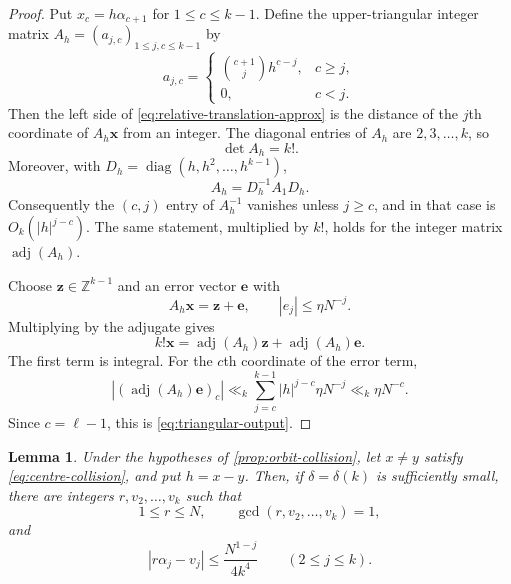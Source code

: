 \documentclass[11pt,reqno]{amsart}
\numberwithin{equation}{section}
\newtheorem{lemma}[lemma]{Lemma}
\theoremstyle{definition}
\theoremstyle{remark}
\newcommand{\Z}{\mathbb Z}
\begin{document}
\begin{proof}
Put $x_c=h\alpha_{c+1}$ for $1\le c\le k-1$.  Define the upper-triangular integer matrix $A_h=(a_{j,c})_{1\le j,c\le k-1}$ by
\[
  a_{j,c}=
  \begin{cases}
    \displaystyle\binom{c+1}{j}h^{c-j},&c\ge j,\\
    0,&c<j.
  \end{cases}
\]
Then the left side of \eqref{eq:relative-translation-approx} is the distance of the $j$th coordinate of $A_h\boldsymbol x$ from an integer.  The diagonal entries of $A_h$ are $2,3,\ldots,k$, so
\begin{equation}\label{eq:Ah-det}
  \det A_h=k!.
\end{equation}
Moreover, with $D_h=\operatorname{diag}(h,h^2,\ldots,h^{k-1})$,
\[
  A_h=D_h^{-1}A_1D_h.
\]
Consequently the $(c,j)$ entry of $A_h^{-1}$ vanishes unless $j\ge c$, and in that case is $O_k(|h|^{j-c})$.  The same statement, multiplied by $k!$, holds for the integer matrix $\operatorname{adj}(A_h)$.

Choose $\boldsymbol z\in\Z^{k-1}$ and an error vector $\boldsymbol e$ with
\[
  A_h\boldsymbol x=\boldsymbol z+\boldsymbol e,
  \qquad |e_j|\le\eta N^{-j}.
\]
Multiplying by the adjugate gives
\[
  k!\boldsymbol x
  =\operatorname{adj}(A_h)\boldsymbol z
   +\operatorname{adj}(A_h)\boldsymbol e.
\]
The first term is integral.  For the $c$th coordinate of the error term,
\[
  \left|(\operatorname{adj}(A_h)\boldsymbol e)_c\right|
  \ll_k
  \sum_{j=c}^{k-1}|h|^{j-c}\eta N^{-j}
  \ll_k\eta N^{-c}.
\]
Since $c=\ell-1$, this is \eqref{eq:triangular-output}.
\end{proof}

\begin{lemma}\label{lem:collision-to-approximation}
Under the hypotheses of \cref{prop:orbit-collision}, let $x\ne y$ satisfy \eqref{eq:centre-collision}, and put $h=x-y$.  Then, if $\delta=\delta(k)$ is sufficiently small, there are integers $r,v_2,\ldots,v_k$ such that
\begin{equation}\label{eq:preliminary-r-size}
  1\le r\le N,
  \qquad
  \gcd(r,v_2,\ldots,v_k)=1,
\end{equation}
and
\begin{equation}\label{eq:preliminary-r-approx}
  |r\alpha_j-v_j|
  \le\frac{N^{1-j}}{4k^4}
  \qquad(2\le j\le k).
\end{equation}
\end{lemma}
\end{document}
